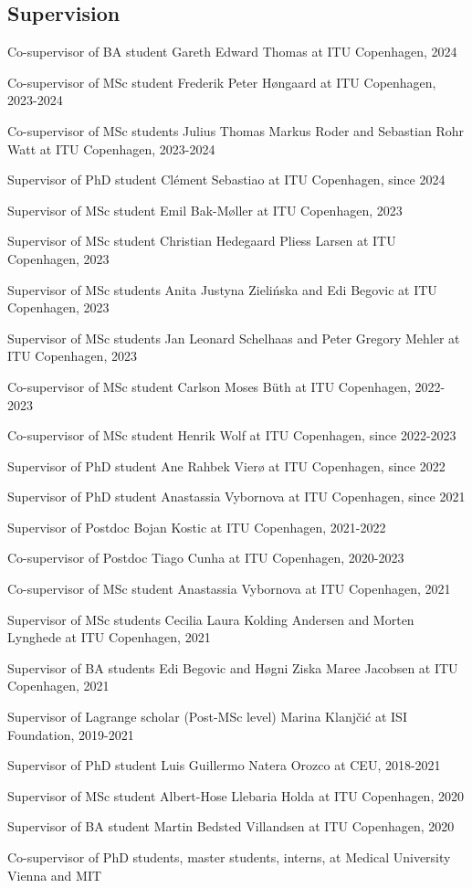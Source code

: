 \documentclass[10pt,a4paper]{article}
\renewenvironment{itemize}{
  \begin{list}{}{
    \setlength{\leftmargin}{1.5em}
    \setlength{\itemsep}{0.25em}
    \setlength{\parskip}{0pt}
    \setlength{\parsep}{0.25em}
  }
}{
  \end{list}
}
\begin{document}
\subsection*{Supervision}
\begin{itemize}
\item{Co-supervisor of BA student Gareth Edward Thomas at ITU Copenhagen, 2024}
\item{Co-supervisor of MSc student Frederik Peter Høngaard at ITU Copenhagen, 2023-2024}
\item{Co-supervisor of MSc students Julius Thomas Markus Roder and Sebastian Rohr Watt at ITU Copenhagen, 2023-2024}
\item{Supervisor of PhD student Clément Sebastiao at ITU Copenhagen, since 2024}
\item{Supervisor of MSc student Emil Bak-Møller at ITU Copenhagen, 2023}
\item{Supervisor of MSc student Christian Hedegaard Pliess Larsen at ITU Copenhagen, 2023}
\item{Supervisor of MSc students Anita Justyna Zielińska and Edi Begovic at ITU Copenhagen, 2023}
\item{Supervisor of MSc students Jan Leonard Schelhaas and Peter Gregory Mehler at ITU Copenhagen, 2023}
\item{Co-supervisor of MSc student Carlson Moses Büth at ITU Copenhagen, 2022-2023}
\item{Co-supervisor of MSc student Henrik Wolf at ITU Copenhagen, since 2022-2023}
\item{Supervisor of PhD student Ane Rahbek Vierø at ITU Copenhagen, since 2022}
\item{Supervisor of PhD student Anastassia Vybornova at ITU Copenhagen, since 2021}
\item{Supervisor of Postdoc Bojan Kostic at ITU Copenhagen, 2021-2022}
\item{Co-supervisor of Postdoc Tiago Cunha at ITU Copenhagen, 2020-2023}
\item{Co-supervisor of MSc student Anastassia Vybornova at ITU Copenhagen, 2021}
\item{Supervisor of MSc students Cecilia Laura Kolding Andersen and Morten Lynghede at ITU Copenhagen, 2021}
\item{Supervisor of BA students Edi Begovic and Høgni Ziska Maree Jacobsen at ITU Copenhagen, 2021}
\item{Supervisor of Lagrange scholar (Post-MSc level) Marina Klanj\v{c}i{\'c} at ISI Foundation, 2019-2021}
\item{Supervisor of PhD student Luis Guillermo Natera Orozco at CEU, 2018-2021}
\item{Supervisor of MSc student Albert-Hose Llebaria Holda at ITU Copenhagen, 2020}
\item{Supervisor of BA student Martin Bedsted Villandsen at ITU Copenhagen, 2020}
\item{Co-supervisor of PhD students, master students, interns, at Medical University Vienna and MIT}
\end{itemize}
\end{document}
